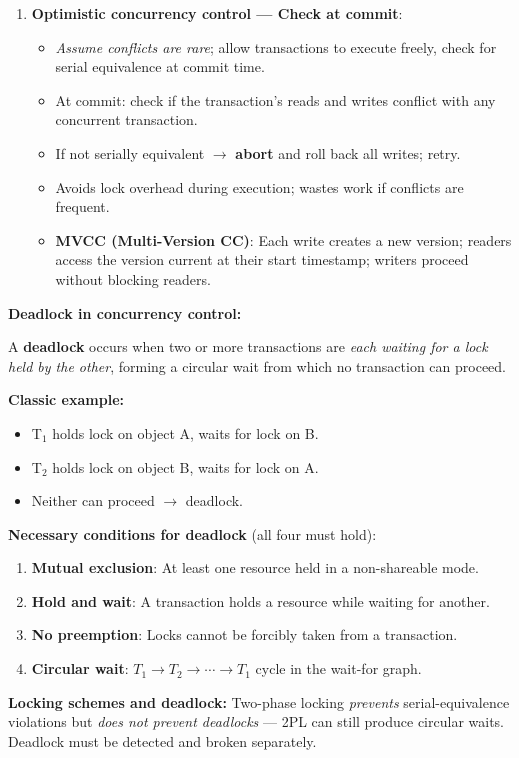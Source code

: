 \documentclass[11pt,a4paper]{article}
\newcommand{\key}[1]{\textbf{\textcolor{keyred}{#1}}}
\begin{document}
\begin{answerbox}
\begin{enumerate}
  \item \textbf{Optimistic concurrency control --- Check at commit}:
    \begin{itemize}
      \item \emph{Assume conflicts are rare}; allow transactions to execute freely, check for serial equivalence at commit time.
      \item At commit: check if the transaction's reads and writes conflict with any concurrent transaction.
      \item If not serially equivalent $\to$ \textbf{abort} and roll back all writes; retry.
      \item Avoids lock overhead during execution; wastes work if conflicts are frequent.
      \item \textbf{MVCC (Multi-Version CC)}: Each write creates a new version; readers access the version current at their start timestamp; writers proceed without blocking readers.
    \end{itemize}
\end{enumerate}

\bigskip
\textbf{Deadlock in concurrency control:}

A \key{deadlock} occurs when two or more transactions are \emph{each waiting for a lock held by the other}, forming a circular wait from which no transaction can proceed.

\textbf{Classic example:}
\begin{itemize}
  \item T$_1$ holds lock on object A, waits for lock on B.
  \item T$_2$ holds lock on object B, waits for lock on A.
  \item Neither can proceed $\to$ deadlock.
\end{itemize}

\textbf{Necessary conditions for deadlock} (all four must hold):
\begin{enumerate}
  \item \textbf{Mutual exclusion}: At least one resource held in a non-shareable mode.
  \item \textbf{Hold and wait}: A transaction holds a resource while waiting for another.
  \item \textbf{No preemption}: Locks cannot be forcibly taken from a transaction.
  \item \textbf{Circular wait}: $T_1 \to T_2 \to \cdots \to T_1$ cycle in the wait-for graph.
\end{enumerate}

\textbf{Locking schemes and deadlock:} Two-phase locking \emph{prevents} serial-equivalence violations but \emph{does not prevent deadlocks} --- 2PL can still produce circular waits. Deadlock must be detected and broken separately.
\end{answerbox}
\end{document}
